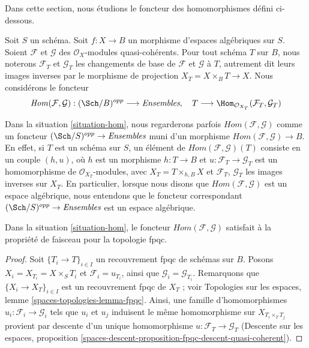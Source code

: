 \noindent
Dans cette section, nous étudions le foncteur des homomorphismes défini
ci-dessous.

\begin{situation}
\label{situation-hom}
Soit $S$ un schéma. Soit $f : X \to B$ un morphisme d'espaces algébriques sur
$S$. Soient $\mathcal{F}$ et $\mathcal{G}$ des $\mathcal{O}_X$-modules
quasi-cohérents. Pour tout schéma $T$ sur $B$, nous noterons $\mathcal{F}_T$
et $\mathcal{G}_T$ les changements de base de $\mathcal{F}$ et
$\mathcal{G}$ à $T$, autrement dit leurs images inverses par le morphisme de
projection $X_T = X \times_B T \to X$. Nous considérons le foncteur
\begin{equation}
\label{equation-hom}
\mathit{Hom}(\mathcal{F}, \mathcal{G}) :
(\Sch/B)^{opp}
\longrightarrow
\textit{Ensembles},\quad
T
\longrightarrow
\Hom_{\mathcal{O}_{X_T}}(\mathcal{F}_T, \mathcal{G}_T)
\end{equation}
\end{situation}

\noindent
Dans la situation \ref{situation-hom}, nous regarderons parfois
$\mathit{Hom}(\mathcal{F}, \mathcal{G})$ comme un foncteur
$(\Sch/S)^{opp} \to \textit{Ensembles}$ muni d'un morphisme
$\mathit{Hom}(\mathcal{F}, \mathcal{G}) \to B$. En effet, si $T$ est un
schéma sur $S$, un élément de
$\mathit{Hom}(\mathcal{F}, \mathcal{G})(T)$ consiste en un couple $(h, u)$,
où $h$ est un morphisme $h : T \to B$ et
$u : \mathcal{F}_T \to \mathcal{G}_T$ est un homomorphisme de
$\mathcal{O}_{X_T}$-modules, avec $X_T = T \times_{h, B} X$ et
$\mathcal{F}_T$, $\mathcal{G}_T$ les images inverses sur $X_T$. En
particulier, lorsque nous disons que
$\mathit{Hom}(\mathcal{F}, \mathcal{G})$ est un espace algébrique, nous
entendons que le foncteur correspondant
$(\Sch/S)^{opp} \to \textit{Ensembles}$ est un espace algébrique.

\begin{lemma}
\label{lemma-hom-sheaf}
Dans la situation \ref{situation-hom}, le foncteur
$\mathit{Hom}(\mathcal{F}, \mathcal{G})$
satisfait à la propriété de faisceau pour la topologie fpqc.
\end{lemma}

\begin{proof}
Soit $\{T_i \to T\}_{i \in I}$ un recouvrement fpqc de schémas sur $B$.
Posons $X_i = X_{T_i} = X \times_S T_i$ et $\mathcal{F}_i = u_{T_i}$,
ainsi que $\mathcal{G}_i = \mathcal{G}_{T_i}$. Remarquons que
$\{X_i \to X_T\}_{i \in I}$ est un recouvrement fpqc de $X_T$ ; voir
Topologies sur les espaces, lemme
\ref{spaces-topologies-lemma-fpqc}. Ainsi, une famille d'homomorphismes
$u_i : \mathcal{F}_i \to \mathcal{G}_i$ tels que $u_i$ et $u_j$
induisent le même homomorphisme sur $X_{T_i \times_T T_j}$ provient par
descente d'un unique homomorphisme
$u : \mathcal{F}_T \to \mathcal{G}_T$
(Descente sur les espaces, proposition
\ref{spaces-descent-proposition-fpqc-descent-quasi-coherent}).
\end{proof}


